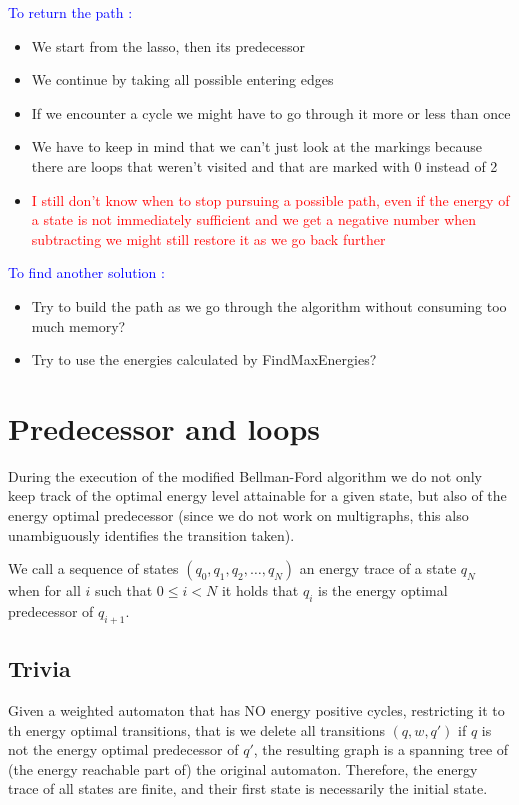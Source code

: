 \documentclass{rapport}
\begin{document}
\vspace{12pt}

\textcolor{blue}{To return the path :}\\
\begin{itemize}
    \item We start from the lasso, then its predecessor
    \item We continue by taking all possible entering edges
    \item If we encounter a cycle we might have to go through it more or less than once
    \item We have to keep in mind that we can't just look at the markings because there are loops that weren't visited and that are marked with 0 instead of 2
    \item \textcolor{red}{I still don’t know when to stop pursuing a possible path, even if the energy of a state is not immediately sufficient and we get a negative number when subtracting we might still restore it as we go back further}
\end{itemize}

\vspace{12pt}

\textcolor{blue}{To find another solution :}\\
\begin{itemize}
    \item Try to build the path as we go through the algorithm without consuming too much memory?
    \item Try to use the energies calculated by FindMaxEnergies?
\end{itemize}

\section{Predecessor and loops}

During the execution of the modified Bellman-Ford algorithm we do not only
keep track of the optimal energy level attainable for a given state, but also
of the energy optimal predecessor (since we do not work on multigraphs,
this also unambiguously identifies the transition taken).

We call a sequence of states $(q_0, q_1, q_2, \ldots,q_N)$ an energy trace
of a state $q_N$ when for all $i$ such that $0\le i < N$
it holds that $q_i$ is the energy optimal predecessor of $q_{i+1}$.

\subsection*{Trivia}
Given a weighted automaton that has NO energy positive cycles, restricting it
to th energy optimal transitions, that is we delete all transitions
$(q,w,q')$ if $q$ is not the energy optimal predecessor of $q'$, the resulting
graph is a spanning tree of (the energy reachable part of) the original automaton.
Therefore, the energy trace of all states are finite, and their first state
is necessarily the initial state.
\end{document}
